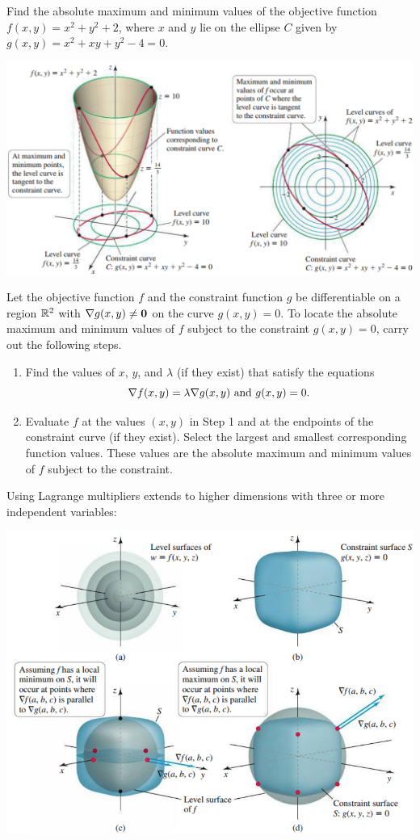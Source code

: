 \documentclass[../mathNotesPreamble]{subfiles}
\begin{document}
  \begin{ex*}
    Find the absolute maximum and minimum values of the objective function $f(x,y)=x^2+y^2+2$, where $x$ and $y$ lie on the ellipse $C$ given by $g(x,y)=x^2+xy+y^2-4=0$.
  \end{ex*}
  \begin{flushright}
    \includegraphics[width=0.65\linewidth]{../images/briggs_15_08/fig15_81}
  \end{flushright}
  \pagebreak

  \begin{thmBox*}
    Let the objective function $f$ and the constraint function $g$ be differentiable on a region $\mathbb{R}^2$ with $\nabla g(x,y)\neq\mathbf{0}$ on the curve $g(x,y)=0$. To locate the absolute maximum and minimum values of $f$ subject to the constraint $g(x,y)=0$, carry out the following steps.
    \begin{enumerate}
      \item 
        Find the values of $x$, $y$, and $\lambda$ (if they exist) that satisfy the equations
          \[\nabla f(x,y)=\lambda \nabla g(x,y) \textnormal{ and } g(x,y)=0.\]
      \item 
        Evaluate $f$ at the values $(x,y)$ in Step 1 and at the endpoints of the constraint curve (if they exist). Select the largest and smallest corresponding function values. These values are the absolute maximum and minimum values of $f$ subject to the constraint.
    \end{enumerate}
  \end{thmBox*}

  \noindent
  Using Lagrange multipliers extends to higher dimensions with three or more independent variables:
  \begin{center}
    \includegraphics[width=0.605\linewidth]{../images/briggs_15_08/fig15_82}
  \end{center}
  \pagebreak
\end{document}

